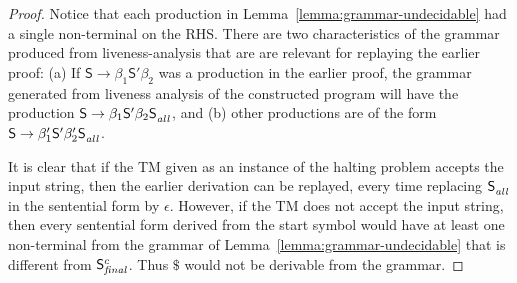 \documentclass[9pt,preprint,nonatbib]{sigplanconf}
\begin{document}
\begin{proof}
Notice that  each production  in Lemma~\ref{lemma:grammar-undecidable}
had a single non-terminal on the RHS. There are two characteristics of
the grammar produced from liveness-analysis  that are are relevant for
replaying the  earlier proof:  (a) If $\mathsf{S}  \rightarrow \beta_1
\mathsf{S'}  \beta_2$  was a  production  in  the earlier  proof,  the
grammar  generated from  liveness  analysis of the constructed program
will  have the  production
$\mathsf{S}      \rightarrow      \beta_1     \mathsf{S'}      \beta_2
\mathsf{S}_{\mathit{\mathit{all}}}^{}$,  and (b)  other  productions are  of the  form
$\mathsf{S}       \rightarrow       \beta_1'\mathsf{S'}       \beta_2'
\mathsf{S}_{\mathit{all}}^{}$.

It is clear that if the TM given as an instance of the halting problem
accepts the input string, then the earlier derivation can be replayed,
every   time   replacing   $\mathsf{S}_{\mathit{\mathit{all}}}^{}$   in   the
sentential form by $\epsilon$. However, if  the TM does not accept the
input string, then every sentential form derived from the start symbol
would    have     at    least    one    non-terminal from the grammar
of Lemma~\ref{lemma:grammar-undecidable} that is different
from $\mathsf{S}_{\mathit{final}}^{c}$.   Thus  $\$$  would  not  be
derivable from the grammar.
\end{proof}
\end{document}
